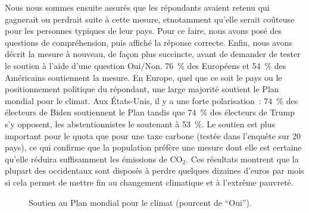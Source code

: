 \documentclass[a5paper,french]{memoir}
\begin{document}
Nous nous sommes ensuite assurés que les répondants avaient retenu qui gagnerait ou perdrait suite à cette mesure, etnotamment qu'elle serait coûteuse pour les personnes typiques de leur pays. Pour ce faire, nous avons posé des questions de compréhension, puis affiché la réponse correcte. Enfin, nous avons décrit la mesure à nouveau, de façon plus succincte, avant de demander de tester le soutien à l'aide d'une question Oui/Non. 76~\% des Européens et 54~\% des Américains soutiennent la mesure. En Europe, quel que ce soit le pays ou le positionnement politique du répondant, une large majorité soutient le Plan mondial pour le climat. Aux États-Unis, il y a une forte polarisation~: 74~\% des électeurs de Biden soutiennent le Plan tandis que 74~\% des électeurs de Trump s'y opposent, les abstentionnistes le soutenant à 53~\%. Le soutien est plus important pour le quota que pour une taxe carbone (testée dans l'enquête sur 20 pays), ce qui confirme que la population préfère une mesure dont elle est certaine qu'elle réduira suffisamment les émissions de CO$_\text{2}$. Ces résultats montrent que la plupart des occidentaux sont disposés à perdre quelques dizaines d'euros par mois si cela permet de mettre fin au changement climatique et à l'extrême pauvreté. 

\begin{figure}[h!]
  \caption[Soutien au Plan mondial pour le climat]{Soutien au Plan mondial pour le climat (pourcent de ``Oui'').} 
  \label{fig:gcs_support} 
\end{figure}
\end{document}
